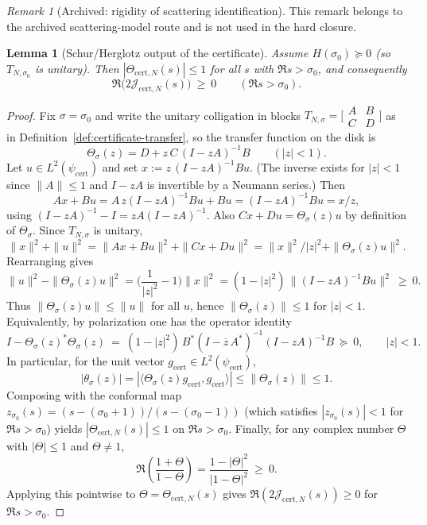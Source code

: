 \documentclass[11pt]{article}
\newtheorem{lemma}[theorem]{Lemma}
\theoremstyle{definition}
\theoremstyle{remark}
\newtheorem{remark}[theorem]{Remark}
\theoremstyle{definition}
\begin{document}
\begin{remark}[Archived: rigidity of scattering identification]\label{rem:attachment-rigidity}
This remark belongs to the archived scattering-model route and is not used in the hard closure.
\end{remark}

\begin{lemma}[Schur/Herglotz output of the certificate]\label{lem:cert-schur-herglotz}
Assume $H(\sigma_0)\succeq 0$ (so $T_{N,\sigma_0}$ is unitary). Then $|\Theta_{\mathrm{cert},N}(s)|\le 1$ for all $s$ with $\Re s>\sigma_0$, and consequently
\[
  \Re\bigl(2\mathcal J_{\mathrm{cert},N}(s)\bigr)\ \ge\ 0\qquad(\Re s>\sigma_0).
\]
\end{lemma}
\begin{proof}
Fix $\sigma=\sigma_0$ and write the unitary colligation in blocks
\(
T_{N,\sigma}=\bigl[\begin{smallmatrix}A&B\\ C&D\end{smallmatrix}\bigr]
\)
as in Definition~\ref{def:certificate-transfer}, so the transfer function on the disk is
\[
  \Theta_{\sigma}(z)=D+z\,C\,(I-zA)^{-1}B\qquad(|z|<1).
\]
Let $u\in L^2(\psi_{\mathrm{cert}})$ and set $x:=z\,(I-zA)^{-1}Bu$. (The inverse exists for $|z|<1$ since $\|A\|\le 1$ and $I-zA$ is invertible by a Neumann series.)
Then
\[
  Ax+Bu = A\,z(I-zA)^{-1}Bu + Bu = (I-zA)^{-1}Bu = x/z,
\]
using $(I-zA)^{-1}-I=zA(I-zA)^{-1}$. Also $Cx+Du=\Theta_\sigma(z)u$ by definition of $\Theta_\sigma$.
Since $T_{N,\sigma}$ is unitary,
\[
  \|x\|^2+\|u\|^2
  = \|Ax+Bu\|^2+\|Cx+Du\|^2
  = \|x\|^2/|z|^2 + \|\Theta_\sigma(z)u\|^2.
\]
Rearranging gives
\[
  \|u\|^2-\|\Theta_\sigma(z)u\|^2
  = \Big(\frac{1}{|z|^2}-1\Big)\|x\|^2
  = (1-|z|^2)\,\|(I-zA)^{-1}Bu\|^2\ \ge\ 0.
\]
Thus $\|\Theta_\sigma(z)u\|\le \|u\|$ for all $u$, hence $\|\Theta_\sigma(z)\|\le 1$ for $|z|<1$.
Equivalently, by polarization one has the operator identity
\[
  I-\Theta_\sigma(z)^*\Theta_\sigma(z)
  \ =\ (1-|z|^2)\,B^*(I-\overline z\,A^*)^{-1}(I-zA)^{-1}B\ \succeq\ 0,
  \qquad |z|<1.
\]
In particular, for the unit vector $g_{\mathrm{cert}}\in L^2(\psi_{\mathrm{cert}})$,
\[
  |\theta_\sigma(z)| = |\langle \Theta_\sigma(z)g_{\mathrm{cert}},g_{\mathrm{cert}}\rangle|
  \le \|\Theta_\sigma(z)\|\le 1.
\]
Composing with the conformal map $z_{\sigma_0}(s)=(s-(\sigma_0+1))/(s-(\sigma_0-1))$ (which satisfies $|z_{\sigma_0}(s)|<1$ for $\Re s>\sigma_0$) yields $|\Theta_{\mathrm{cert},N}(s)|\le 1$ on $\Re s>\sigma_0$.
Finally, for any complex number $\Theta$ with $|\Theta|\le 1$ and $\Theta\neq 1$,
\[
  \Re\!\left(\frac{1+\Theta}{1-\Theta}\right)
  = \frac{1-|\Theta|^2}{|1-\Theta|^2}\ \ge\ 0.
\]
Applying this pointwise to $\Theta=\Theta_{\mathrm{cert},N}(s)$ gives $\Re(2\mathcal J_{\mathrm{cert},N}(s))\ge 0$ for $\Re s>\sigma_0$.
\end{proof}
\end{document}
